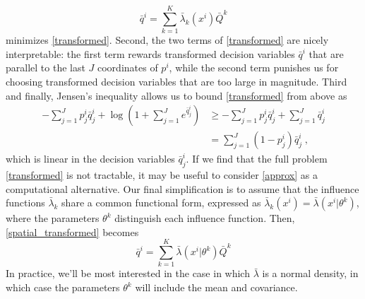 \documentclass[english]{scrartcl}
\begin{document}
	\begin{equation}
		\bar{q}^i = \sum_{k=1}^K \bar{\lambda}_k(x^i) \bar{Q}^k \label{spatial_transformed}
	\end{equation}
	minimizes \eqref{transformed}. 
	Second, the two terms of \eqref{transformed} are nicely interpretable: the first term rewards transformed decision variables $\bar{q}^i$ that are parallel to the last $J$ coordinates of $p^i$, while the second term punishes us for choosing transformed decision variables that are too large in magnitude. Third and finally, Jensen's inequality allows us to bound \eqref{transformed} from above as 
	\begin{align}
		- \sum_{j = 1}^J p^i_j \bar{q}^i_j  + \log \left(1 + \sum_{j = 1}^J e^{\bar{q}^i_j}\right) &\geq - \sum_{j = 1}^J p^i_j \bar{q}^i_j + \sum_{j=1}^J \bar{q}_j^i \\
		&= \sum_{j=1}^J (1 - p_j^i)\bar{q}_j^i\;, \label{approx}
	\end{align}
	which is linear in the decision variables $\bar{q}_j^i$. If we find that the full problem \eqref{transformed} is not tractable, it may be useful to consider \eqref{approx} as a computational alternative. 
	Our final simplification is to assume that the influence functions $\bar{\lambda}_k$ share a common functional form, expressed as $\bar{\lambda}_k(x^i) = \bar{\lambda}(x^i|\theta^k)$, where the parameters $\theta^k$ distinguish each influence function. Then, \eqref{spatial_transformed} becomes 
	\begin{equation}
		\bar{q}^i = \sum_{k=1}^K \bar{\lambda}(x^i|\theta^k) \bar{Q}^k \label{spatial_transformed_2}
	\end{equation}
	In practice, we'll be most interested in the case in which $\bar{\lambda}$ is a normal density, in which case the parameters $\theta^k$ will include the mean and covariance. 
\end{document}
